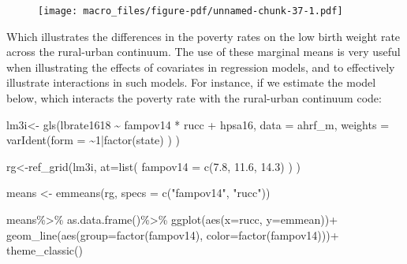 \documentclass[
  letterpaper,
  DIV=11,
  numbers=noendperiod]{scrreprt}
\newenvironment{Shaded}{\begin{snugshade}}{\end{snugshade}}
\newcommand{\AttributeTok}[1]{\textcolor[rgb]{0.40,0.45,0.13}{#1}}
\newcommand{\DecValTok}[1]{\textcolor[rgb]{0.68,0.00,0.00}{#1}}
\newcommand{\FloatTok}[1]{\textcolor[rgb]{0.68,0.00,0.00}{#1}}
\newcommand{\FunctionTok}[1]{\textcolor[rgb]{0.28,0.35,0.67}{#1}}
\newcommand{\NormalTok}[1]{\textcolor[rgb]{0.00,0.23,0.31}{#1}}
\newcommand{\OtherTok}[1]{\textcolor[rgb]{0.00,0.23,0.31}{#1}}
\newcommand{\SpecialCharTok}[1]{\textcolor[rgb]{0.37,0.37,0.37}{#1}}
\newcommand{\StringTok}[1]{\textcolor[rgb]{0.13,0.47,0.30}{#1}}
\begin{document}
\begin{figure}[H]

{\centering \texttt{[image: macro\_files/figure-pdf/unnamed-chunk-37-1.pdf]}

}

\end{figure}

Which illustrates the differences in the poverty rates on the low birth
weight rate across the rural-urban continuum. The use of these marginal
means is very useful when illustrating the effects of covariates in
regression models, and to effectively illustrate interactions in such
models. For instance, if we estimate the model below, which interacts
the poverty rate with the rural-urban continuum code:

\begin{Shaded}
\begin{Highlighting}[]
\NormalTok{lm3i}\OtherTok{\textless{}{-}} \FunctionTok{gls}\NormalTok{(lbrate1618 }\SpecialCharTok{\textasciitilde{}}\NormalTok{  fampov14 }\SpecialCharTok{*}\NormalTok{ rucc }\SpecialCharTok{+}\NormalTok{ hpsa16,}
          \AttributeTok{data =}\NormalTok{ ahrf\_m, }
          \AttributeTok{weights =} \FunctionTok{varIdent}\NormalTok{(}\AttributeTok{form =} \SpecialCharTok{\textasciitilde{}}\DecValTok{1}\SpecialCharTok{|}\FunctionTok{factor}\NormalTok{(state) ) )}
\end{Highlighting}
\end{Shaded}

\begin{Shaded}
\begin{Highlighting}[]
\NormalTok{rg}\OtherTok{\textless{}{-}}\FunctionTok{ref\_grid}\NormalTok{(lm3i,}
             \AttributeTok{at=}\FunctionTok{list}\NormalTok{( }\AttributeTok{fampov14 =} \FunctionTok{c}\NormalTok{(}\FloatTok{7.8}\NormalTok{, }\FloatTok{11.6}\NormalTok{, }\FloatTok{14.3}\NormalTok{) ) )}

\NormalTok{means }\OtherTok{\textless{}{-}} \FunctionTok{emmeans}\NormalTok{(rg, }\AttributeTok{specs =} \FunctionTok{c}\NormalTok{(}\StringTok{"fampov14"}\NormalTok{, }\StringTok{"rucc"}\NormalTok{))}

\NormalTok{means}\SpecialCharTok{\%\textgreater{}\%}
  \FunctionTok{as.data.frame}\NormalTok{()}\SpecialCharTok{\%\textgreater{}\%}
  \FunctionTok{ggplot}\NormalTok{(}\FunctionTok{aes}\NormalTok{(}\AttributeTok{x=}\NormalTok{rucc, }\AttributeTok{y=}\NormalTok{emmean))}\SpecialCharTok{+}
  \FunctionTok{geom\_line}\NormalTok{(}\FunctionTok{aes}\NormalTok{(}\AttributeTok{group=}\FunctionTok{factor}\NormalTok{(fampov14), }\AttributeTok{color=}\FunctionTok{factor}\NormalTok{(fampov14)))}\SpecialCharTok{+}
  \FunctionTok{theme\_classic}\NormalTok{()}
\end{Highlighting}
\end{Shaded}
\end{document}
